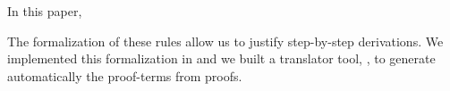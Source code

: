 \documentclass[../main.tex]{subfiles}
\begin{document}








In this paper, 



The formalization of these rules allow us to justify step-by-step \Metis derivations. We implemented this formalization in \Agda and we built
a translator tool, \Athena, to generate automatically the proof-terms
from \Metis proofs.
\end{document}
